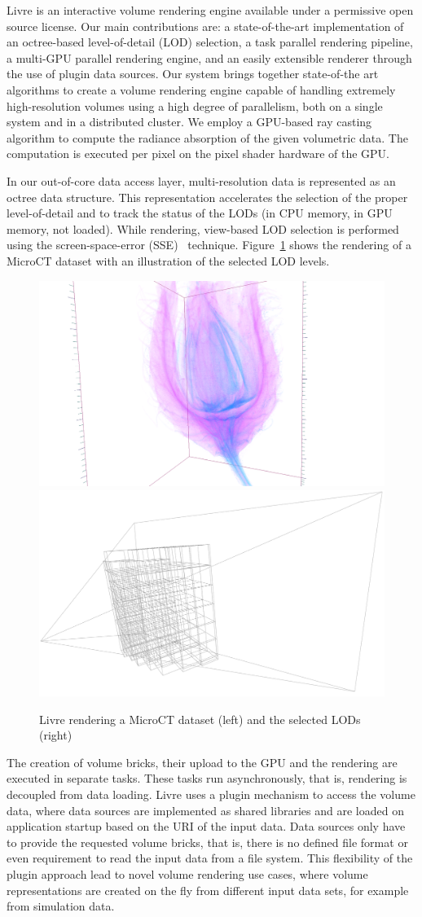 \documentclass[10pt]{llncs}
\newcommand{\fig}[1]{Figure~\ref{#1}}
\begin{document}
Livre is an interactive volume rendering engine available under a permissive
open source license. Our main contributions are: a state-of-the-art
implementation of an octree-based level-of-detail (LOD) selection, a task
parallel rendering pipeline, a multi-GPU parallel rendering engine, and an
easily extensible renderer through the use of plugin data sources. Our system
brings together state-of-the art algorithms to create a volume rendering engine
capable of handling extremely high-resolution volumes using a high degree of
parallelism, both on a single system and in a distributed cluster. We employ a
GPU-based ray casting algorithm to compute the radiance absorption of the given
volumetric data. The computation is executed per pixel on the pixel shader
hardware of the GPU.

In our out-of-core data access layer, multi-resolution data is represented as an
octree data structure. This representation accelerates the selection of the
proper level-of-detail and to track the status of the LODs (in CPU memory, in
GPU memory, not loaded). While rendering, view-based LOD selection is performed
using the screen-space-error (SSE)~\cite{guthe2004} technique. \fig{fLivre}
shows the rendering of a MicroCT dataset with an illustration of the selected
LOD levels.

\begin{figure}[h!t]
    \includegraphics[width=.45\columnwidth]{images/livre}\hfill
    \includegraphics[width=.45\columnwidth]{images/livreLOD}
  \caption{\label{fLivre}Livre rendering a MicroCT dataset (left) and
    the selected LODs (right)}
\end{figure}

The creation of volume bricks, their upload to the GPU and the rendering are
executed in separate tasks. These tasks run asynchronously, that is, rendering
is decoupled from data loading. Livre uses a plugin mechanism to access the
volume data, where data sources are implemented as shared libraries and are
loaded on application startup based on the URI of the input data. Data sources
only have to provide the requested volume bricks, that is, there is no defined
file format or even requirement to read the input data from a file system. This
flexibility of the plugin approach lead to novel volume rendering use cases,
where volume representations are created on the fly from different input data
sets, for example from simulation data.
\end{document}
